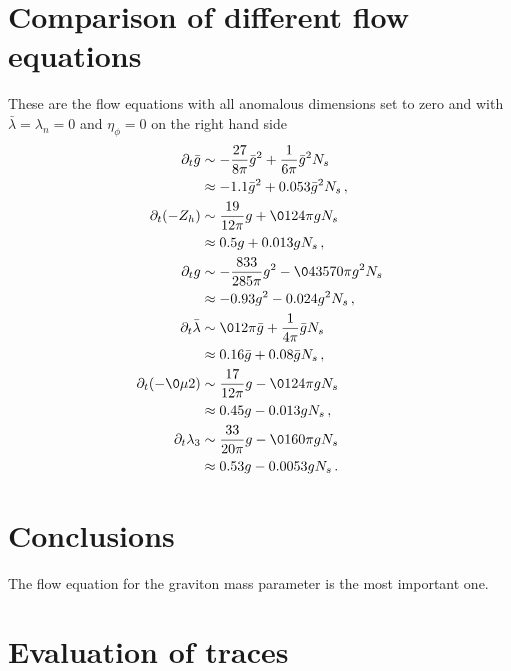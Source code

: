 \documentclass[11pt]{book} %
\begin{document}
{\section{Comparison of different flow equations}

These are the flow equations with all anomalous dimensions set to zero and with $\bar\lambda=\lambda_n=0$ and $\eta_\phi=0$ on the right hand side
\begin{align}
 \partial_t \bar g &\sim -\frac{27}{8 \pi} {\bar g}^2 + \frac1{6\pi}{\bar g}^2 N_s \notag\\
  &\approx -1.1 {\bar g}^2 + 0.053 {\bar g}^2 N_s \,, \label{eq:barg-simple}\\
 \partial_t (-Z_h) &\sim  \frac{19}{12 \pi}g + \01{24 \pi} g N_s \notag\\
  &\approx 0.5 g + 0.013 g N_s \,,\label{eq:etah-simple}\\
 \partial_t g &\sim -\frac{833}{285 \pi }g^2 -\0{43}{570 \pi} g^2 N_s\notag\\
  &\approx -0.93 g^2 - 0.024 g^2 N_s \,,\label{eq:g3-simple}\\
 \partial_t \bar \lambda &\sim \01{2\pi} \bar g + \frac1{4\pi}{\bar g}N_s \notag\\
  &\approx  0.16 \bar g + 0.08 \bar g N_s \,,\label{eq:barlam-simple}\\
 \partial_t (-\0{\mu}2) &\sim \frac{17}{12 \pi }g - \01{24 \pi} g N_s \notag\\
  &\approx 0.45 g - 0.013 g N_s \,,\label{eq:mu-simple}\\
 \partial_t \lambda_3 &\sim \frac{33}{20 \pi }g - \01{60 \pi}g N_s\notag\\
  &\approx 0.53 g - 0.0053 g N_s \,.\label{eq:lam3-simple}
\end{align}



\section{Conclusions}

The flow equation for the graviton mass parameter is the most important one.

\section{Evaluation of traces} \label{app:traces}

}
\end{document}
